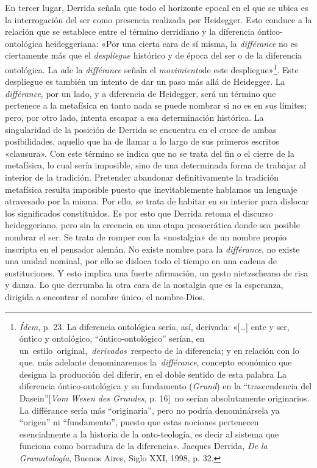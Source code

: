 En tercer lugar, Derrida señala que todo el horizonte epocal en el que se ubica es la interrogación del ser como presencia realizada por Heidegger. Esto conduce a la relación que se establece entre el término derridiano y la diferencia óntico-ontológica heideggeriana: «Por una cierta cara de sí misma, la \emph{différance} no es ciertamente más que el \emph{despliegue} histórico y de época del ser o de la diferencia ontológica. La \emph{a}de la \emph{différance} señala el \emph{movimiento}de este despliegue»\footnote{\emph{Ídem}, p. 23. La diferencia ontológica sería, así, derivada: «{[}\ldots{]} ente y ser, óntico y ontológico, ``óntico-ontológico'' serían, en un~estilo\emph{~}original,~\emph{derivados~}respecto de la diferencia; y en relación con lo que. más adelante denominaremos la~\emph{différance}, concepto económico que designa la producción del diferir, en el doble sentido de esta palabra La diferencia óntico-ontológica y su fundamento (\emph{Grund}) en la ``trascendencia del Dasein''{[}\emph{Vom Wesen des Grundes}, p. 16{]}\emph{~}no serían absolutamente originarios. La différance sería más ``originaria'', pero no podría denominársela ya ``origen'' ni ``fundamento'', puesto que estas nociones pertenecen esencialmente a la historia de la onto-teología, es decir al sistema que funciona como borradura de la diferencia». Jacques Derrida, \emph{De la Gramatología}, Buenos Aires, Siglo XXI, 1998, p. 32.}. Este despliegue es también un intento de dar un paso más allá de Heidegger. La \emph{différance}, por un lado, y a diferencia de Heidegger, será un término que pertenece a la metafísica en tanto nada se puede nombrar si no es en sus límites; pero, por otro lado, intenta escapar a esa determinación histórica. La singularidad de la posición de Derrida se encuentra en el cruce de ambas posibilidades, aquello que ha de llamar a lo largo de sus primeros escritos «clausura». Con este término se indica que no se trata del fin o el cierre de la metafísica, lo cual sería imposible, sino de una determinada forma de trabajar al interior de la tradición. Pretender abandonar definitivamente la tradición metafísica resulta imposible puesto que inevitablemente hablamos un lenguaje atravesado por la misma. Por ello, se trata de habitar en su interior para dislocar los significados constituidos. Es por esto que Derrida retoma el discurso heideggeriano, pero sin la creencia en una etapa presocrática donde sea posible nombrar el ser. Se trata de romper con la «nostalgia» de un nombre propio inscripta en el pensador alemán. No existe nombre para la \emph{différance}, no existe una unidad nominal, por ello se disloca todo el tiempo en una cadena de sustituciones. Y esto implica una fuerte afirmación, un gesto nietzscheano de risa y danza. Lo que derrumba la otra cara de la nostalgia que es la esperanza, dirigida a encontrar el nombre único, el nombre-Dios.

